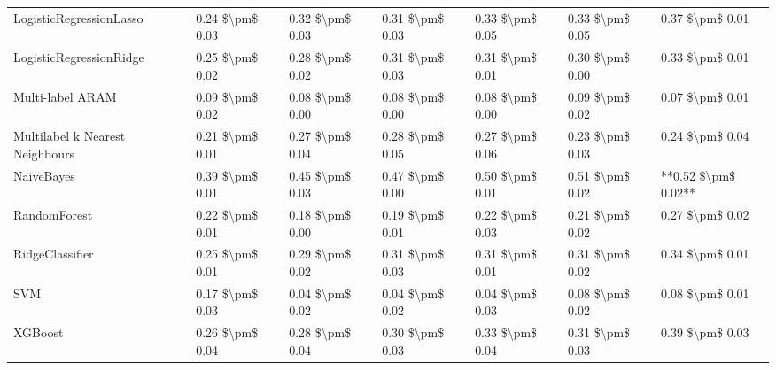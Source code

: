 \begin{tabular}{lllllll}
        LogisticRegressionLasso & 0.24 \$\textbackslash pm\$ 0.03 &           0.32 \$\textbackslash pm\$ 0.03 &       0.31 \$\textbackslash pm\$ 0.03 &        0.33 \$\textbackslash pm\$ 0.05 &                         0.33 \$\textbackslash pm\$ 0.05 &     0.37 \$\textbackslash pm\$ 0.01 \\
        LogisticRegressionRidge & 0.25 \$\textbackslash pm\$ 0.02 &           0.28 \$\textbackslash pm\$ 0.02 &       0.31 \$\textbackslash pm\$ 0.03 &        0.31 \$\textbackslash pm\$ 0.01 &                         0.30 \$\textbackslash pm\$ 0.00 &     0.33 \$\textbackslash pm\$ 0.01 \\
               Multi-label ARAM & 0.09 \$\textbackslash pm\$ 0.02 &           0.08 \$\textbackslash pm\$ 0.00 &       0.08 \$\textbackslash pm\$ 0.00 &        0.08 \$\textbackslash pm\$ 0.00 &                         0.09 \$\textbackslash pm\$ 0.02 &     0.07 \$\textbackslash pm\$ 0.01 \\
Multilabel k Nearest Neighbours & 0.21 \$\textbackslash pm\$ 0.01 &           0.27 \$\textbackslash pm\$ 0.04 &       0.28 \$\textbackslash pm\$ 0.05 &        0.27 \$\textbackslash pm\$ 0.06 &                         0.23 \$\textbackslash pm\$ 0.03 &     0.24 \$\textbackslash pm\$ 0.04 \\
                     NaiveBayes & 0.39 \$\textbackslash pm\$ 0.01 &           0.45 \$\textbackslash pm\$ 0.03 &       0.47 \$\textbackslash pm\$ 0.00 &        0.50 \$\textbackslash pm\$ 0.01 &                         0.51 \$\textbackslash pm\$ 0.02 & **0.52 \$\textbackslash pm\$ 0.02** \\
                   RandomForest & 0.22 \$\textbackslash pm\$ 0.01 &           0.18 \$\textbackslash pm\$ 0.00 &       0.19 \$\textbackslash pm\$ 0.01 &        0.22 \$\textbackslash pm\$ 0.03 &                         0.21 \$\textbackslash pm\$ 0.02 &     0.27 \$\textbackslash pm\$ 0.02 \\
                RidgeClassifier & 0.25 \$\textbackslash pm\$ 0.01 &           0.29 \$\textbackslash pm\$ 0.02 &       0.31 \$\textbackslash pm\$ 0.03 &        0.31 \$\textbackslash pm\$ 0.01 &                         0.31 \$\textbackslash pm\$ 0.02 &     0.34 \$\textbackslash pm\$ 0.01 \\
                            SVM & 0.17 \$\textbackslash pm\$ 0.03 &           0.04 \$\textbackslash pm\$ 0.02 &       0.04 \$\textbackslash pm\$ 0.02 &        0.04 \$\textbackslash pm\$ 0.03 &                         0.08 \$\textbackslash pm\$ 0.02 &     0.08 \$\textbackslash pm\$ 0.01 \\
                        XGBoost & 0.26 \$\textbackslash pm\$ 0.04 &           0.28 \$\textbackslash pm\$ 0.04 &       0.30 \$\textbackslash pm\$ 0.03 &        0.33 \$\textbackslash pm\$ 0.04 &                         0.31 \$\textbackslash pm\$ 0.03 &     0.39 \$\textbackslash pm\$ 0.03 \\
\bottomrule
\end{tabular}
